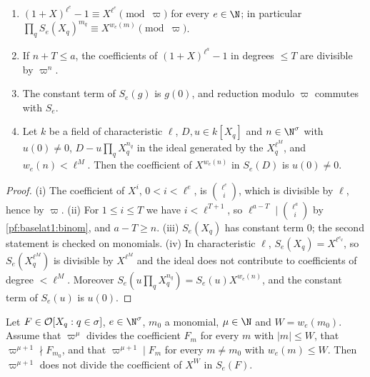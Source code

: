 \begin{lemma}\label{pf:baselat1:subst}
\begin{enumerate}[label=(\roman*)]
\item $(1+X)^{\ell^e}-1\equiv X^{\ell^e}\pmod{\varpi}$ for every $e\in\N$; in particular
  $\prod_q S_e(X_q)^{m_q}\equiv X^{w_e(m)}\pmod\varpi$.
\item If $n+T\le a$, the coefficients of $(1+X)^{\ell^a}-1$ in degrees $\le T$ are divisible by $\varpi^n$.
\item The constant term of $S_e(g)$ is $g(0)$, and reduction modulo $\varpi$ commutes with $S_e$.
\item Let $k$ be a field of characteristic $\ell$, $D,u\in k[X_q]$ and $n\in\N^\sigma$ with $u(0)\ne0$,
  $D-u\prod_qX_q^{n_q}$ in the ideal generated by the $X_q^{\ell^M}$, and $w_e(n)<\ell^M$. Then the coefficient of
  $X^{w_e(n)}$ in $S_e(D)$ is $u(0)\neq0$.
\end{enumerate}
%
%
\end{lemma}

\begin{proof}
(i) The coefficient of $X^i$, $0<i<\ell^e$, is $\binom{\ell^e}{i}$, which is divisible by $\ell$, hence by
$\varpi$. (ii) For $1\le i\le T$ we have $i<\ell^{T+1}$, so $\ell^{a-T}\mid\binom{\ell^a}{i}$ by
\cref{pf:baselat1:binom}, and $a-T\ge n$. (iii) $S_e(X_q)$ has constant term $0$; the second statement is
checked on monomials. (iv) In characteristic $\ell$, $S_e(X_q)=X^{\ell^{e_q}}$, so $S_e(X_q^{\ell^M})$ is divisible
by $X^{\ell^M}$ and the ideal does not contribute to coefficients of degree $<\ell^M$. Moreover
$S_e(u\prod_qX_q^{n_q})=S_e(u)X^{w_e(n)}$, and the constant term of $S_e(u)$ is $u(0)$.
\end{proof}

\begin{lemma}\label{pf:baselat1:minweight}
Let $F\in\mathcal O[X_q:q\in\sigma]$, $e\in\N^\sigma$, $m_0$ a monomial, $\mu\in\N$ and $W=w_e(m_0)$. Assume that
$\varpi^\mu$ divides the coefficient $F_m$ for every $m$ with $|m|\le W$, that $\varpi^{\mu+1}\nmid F_{m_0}$, and that
$\varpi^{\mu+1}\mid F_m$ for every $m\ne m_0$ with $w_e(m)\le W$. Then $\varpi^{\mu+1}$ does not divide the coefficient of
$X^W$ in $S_e(F)$.
\end{lemma}

